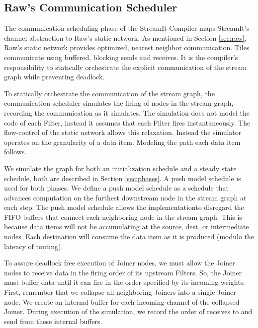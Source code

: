 
\subsection{Raw's Communication Scheduler}
\label{sec:rawcommunic}

The communication scheduling phase of the StreamIt Compiler maps
StreamIt's channel abstraction to Raw's static network.  As mentioned
in Section \ref{sec:raw}, Raw's static network provides optimized, nearest
neighbor communication.  Tiles communicate using buffered, blocking
sends and receives.  It is the compiler's responsibility to statically
orchestrate the explicit communication of the stream graph while
preventing deadlock.

To statically orchestrate the communication of the stream graph, the
communication scheduler simulates the firing of nodes in the stream
graph, recording the communication as it simulates.  The simulation
does not model the code of each Filter, instead it assumes that each
Filter fires instantaneously.  The flow-control of the static network
allows this relaxation.  Instead the simulator operates on the
granularity of a data item.  Modeling the path each data item follows.

We simulate the graph for both an initialization schedule and a steady
state schedule, both are described in Section \ref{sec:phases}.  A push model
schedule is used for both phases.  We define a push model schedule as
a schedule that advances computation on the furthest downstream node
in the stream graph at each step.  The push model schedule allows the
implementationto disregard the FIFO buffers that connect each neighboring
node in the stream graph.  This is because data items will not be
accumulating at the source, dest, or intermediate nodes.  
Each destination will consume the data
item as it is produced (modulo the latency of routing).

To assure deadlock free execution of Joiner nodes, we must allow the
Joiner nodes to receive data in the firing order of its upstream
Filters. So, the Joiner must buffer data until it can fire
in the order specified by its incoming weights.  First, remember that
we collapse all neighboring Joiners into a single Joiner node.
We create an internal buffer for each
incoming channel of the collapsed Joiner.  During execution of the
simulation, we record the order of receives to and send from these
internal buffers.


